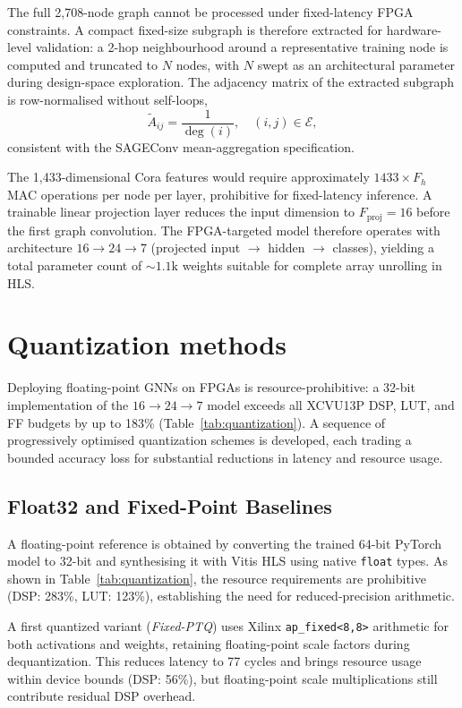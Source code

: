 \documentclass{IEEEtran}
\begin{document}
The full 2,708-node graph cannot be processed under fixed-latency FPGA constraints. A compact fixed-size subgraph is therefore extracted for hardware-level validation: a 2-hop neighbourhood around a representative training node is computed and truncated to $N$ nodes, with $N$ swept as an architectural parameter during design-space exploration. The adjacency matrix of the extracted subgraph is row-normalised without self-loops,
\begin{equation}
    \tilde{A}_{ij} = \frac{1}{\deg(i)},\quad (i,j)\in\mathcal{E},
    \label{eq:adj_norm}
\end{equation}
consistent with the SAGEConv mean-aggregation specification.

The 1,433-dimensional Cora features would require approximately $1433\times F_h$ MAC operations per node per layer, prohibitive for fixed-latency inference. A trainable linear projection layer reduces the input dimension to $F_{\mathrm{proj}}=16$ before the first graph convolution. The FPGA-targeted model therefore operates with architecture $16{\to}24{\to}7$ (projected input $\to$ hidden $\to$ classes), yielding a total parameter count of ${\sim}1.1\mathrm{k}$ weights suitable for complete array unrolling in HLS.


\section{Quantization methods}
\label{sec:methods}

Deploying floating-point GNNs on FPGAs is resource-prohibitive: a 32-bit implementation of the $16{\to}24{\to}7$ model exceeds all XCVU13P DSP, LUT, and FF budgets by up to 183\% (Table~\ref{tab:quantization}). A sequence of progressively optimised quantization schemes is developed, each trading a bounded accuracy loss for substantial reductions in latency and resource usage.

\subsection{Float32 and Fixed-Point Baselines}

A floating-point reference is obtained by converting the trained 64-bit PyTorch model to 32-bit and synthesising it with Vitis HLS using native \texttt{float} types. As shown in Table~\ref{tab:quantization}, the resource requirements are prohibitive (DSP: 283\%, LUT: 123\%), establishing the need for reduced-precision arithmetic.

A first quantized variant (\textit{Fixed-PTQ}) uses Xilinx \texttt{ap\_fixed<8,8>} arithmetic for both activations and weights, retaining floating-point scale factors during dequantization. This reduces latency to 77 cycles and brings resource usage within device bounds (DSP: 56\%), but floating-point scale multiplications still contribute residual DSP overhead.
\end{document}
